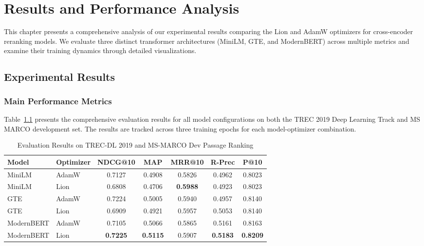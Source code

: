 \chapter{Results and Performance Analysis}
\label{Chapter5}

This chapter presents a comprehensive analysis of our experimental results comparing the Lion and AdamW optimizers for cross-encoder reranking models. We evaluate three distinct transformer architectures (MiniLM, GTE, and ModernBERT) across multiple metrics and examine their training dynamics through detailed visualizations.

\section{Experimental Results}

\subsection{Main Performance Metrics}

Table~\ref{tab:main_results} presents the comprehensive evaluation results for all model configurations on both the TREC 2019 Deep Learning Track and MS MARCO development set. The results are tracked across three training epochs for each model-optimizer combination.

\begin{table}[htbp]
\centering
\caption{Evaluation Results on TREC-DL 2019 and MS-MARCO Dev Passage Ranking}
\label{tab:main_results}
\begin{tabular}{l l c c c c c}
\toprule
\textbf{Model} & \textbf{Optimizer} & \textbf{NDCG@10} & \textbf{MAP} & \textbf{MRR@10} & \textbf{R-Prec} & \textbf{P@10} \\
\midrule
MiniLM & AdamW & 0.7127 & 0.4908 & 0.5826 & 0.4962 & 0.8023 \\
MiniLM & Lion & 0.6808 & 0.4706 & \textbf{0.5988} & 0.4923 & 0.8023 \\
GTE & AdamW & 0.7224 & 0.5005 & 0.5940 & 0.4957 & 0.8140 \\
GTE & Lion & 0.6909 & 0.4921 & 0.5957 & 0.5053 & 0.8140 \\
ModernBERT & AdamW & 0.7105 & 0.5066 & 0.5865 & 0.5161 & 0.8163 \\
ModernBERT & Lion & \textbf{0.7225} & \textbf{0.5115} & 0.5907 & \textbf{0.5183} & \textbf{0.8209} \\
\bottomrule
\end{tabular}
\end{table}

